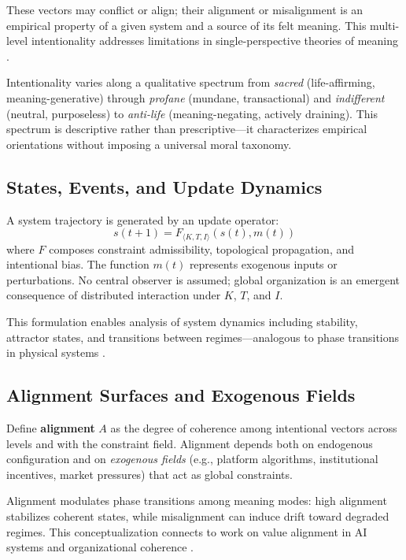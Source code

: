 \documentclass[12pt]{article}
\begin{document}
These vectors may conflict or align; their alignment or misalignment is an empirical property of a given system and a source of its felt meaning. This multi-level intentionality addresses limitations in single-perspective theories of meaning \citep{grice1957meaning}.

Intentionality varies along a qualitative spectrum from \textit{sacred} (life-affirming, meaning-generative) through \textit{profane} (mundane, transactional) and \textit{indifferent} (neutral, purposeless) to \textit{anti-life} (meaning-negating, actively draining). This spectrum is descriptive rather than prescriptive—it characterizes empirical orientations without imposing a universal moral taxonomy.

\subsection{States, Events, and Update Dynamics}

A system trajectory is generated by an update operator:
\[
s(t+1) = F_{\langle K,T,I \rangle}(s(t), m(t))
\]
where $F$ composes constraint admissibility, topological propagation, and intentional bias. The function $m(t)$ represents exogenous inputs or perturbations. No central observer is assumed; global organization is an emergent consequence of distributed interaction under $K$, $T$, and $I$.

This formulation enables analysis of system dynamics including stability, attractor states, and transitions between regimes—analogous to phase transitions in physical systems \citep{scheffer2009critical}.

\subsection{Alignment Surfaces and Exogenous Fields}

Define \textbf{alignment} $A$ as the degree of coherence among intentional vectors across levels and with the constraint field. Alignment depends both on endogenous configuration and on \textit{exogenous fields} (e.g., platform algorithms, institutional incentives, market pressures) that act as global constraints.

Alignment modulates phase transitions among meaning modes: high alignment stabilizes coherent states, while misalignment can induce drift toward degraded regimes. This conceptualization connects to work on value alignment in AI systems \citep{gabriel2020artificial} and organizational coherence \citep{weick1995sensemaking}.
\end{document}
